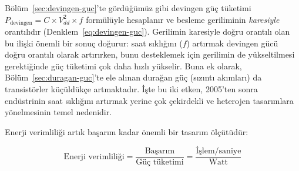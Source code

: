 Bölüm~\ref{sec:devingen-guc}'te gördüğümüz gibi devingen güç tüketimi $P_{\text{devingen}} = C \times V_{dd}^2 \times f$ formülüyle hesaplanır ve besleme geriliminin \emph{karesiyle} orantılıdır (Denklem~\ref{eq:devingen-guc}). Gerilimin karesiyle doğru orantılı olan bu ilişki önemli bir sonuç doğurur: saat sıklığını ($f$) artırmak devingen gücü doğru orantılı olarak artırırken, bunu desteklemek için gerilimin de yükseltilmesi gerektiğinde güç tüketimi çok daha hızlı yükselir. Buna ek olarak, Bölüm~\ref{sec:duragan-guc}'te ele alınan durağan güç (sızıntı akımları) da transistörler küçüldükçe artmaktadır. İşte bu iki etken, 2005'ten sonra endüstrinin saat sıklığını artırmak yerine çok çekirdekli ve heterojen tasarımlara yönelmesinin temel nedenidir.

Enerji verimliliği artık başarım kadar önemli bir tasarım ölçütüdür:

\begin{equation}
\text{Enerji verimliliği} = \frac{\text{Başarım}}{\text{Güç tüketimi}} = \frac{\text{İşlem/saniye}}{\text{Watt}}
\label{eq:enerji-verimlilik}
\end{equation}

